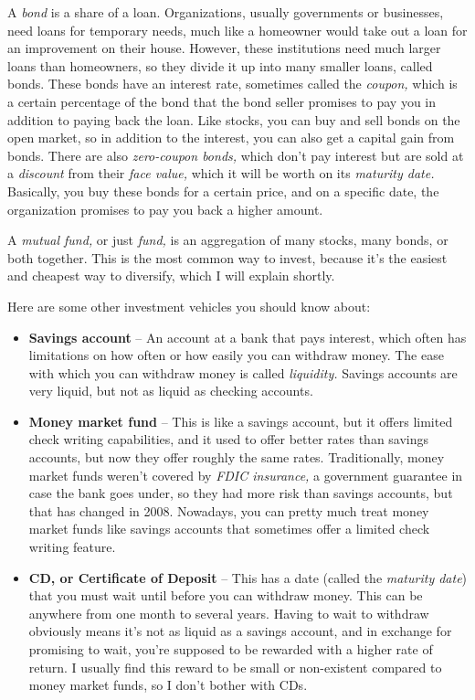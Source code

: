 A \emph{bond} is a share of a loan. Organizations, usually governments or businesses, need loans for temporary needs, much like a homeowner would take out a loan for an improvement on their house.  However, these institutions need much larger loans than homeowners, so they divide it up into many smaller loans, called bonds. These bonds have an interest rate, sometimes called the \emph{coupon,} which is a certain percentage of the bond that the bond seller promises to pay you in addition to paying back the loan. Like stocks, you can buy and sell bonds on the open market, so in addition to the interest, you can also get a capital gain from bonds. There are also \emph{zero-coupon bonds,} which don't pay interest but are sold at a \emph{discount} from their \emph{face value,} which it will be worth on its \emph{maturity date.} Basically, you buy these bonds for a certain price, and on a specific date, the organization promises to pay you back a higher amount.

A \emph{mutual fund,} or just \emph{fund,} is an aggregation of many stocks, many bonds, or both together. This is the most common way to invest, because it's the easiest and cheapest way to diversify, which I will explain shortly.

Here are some other investment vehicles you should know about:
\begin{itemize}
\item \textbf{Savings account} -- An account at a bank that pays interest, which often has limitations on how often or how easily you can withdraw money. The ease with which you can withdraw money is called \emph{liquidity.} Savings accounts are very liquid, but not as liquid as checking accounts.

\item \textbf{Money market fund} -- This is like a savings account, but it offers limited check writing capabilities, and it used to offer better rates than savings accounts, but now they offer roughly the same rates. Traditionally, money market funds weren't covered by \emph{FDIC insurance,} a government guarantee in case the bank goes under, so they had more risk than savings accounts, but that has changed in 2008. Nowadays, you can pretty much treat money market funds like savings accounts that sometimes offer a limited check writing feature.

\item \textbf{CD, or Certificate of Deposit} -- This has a date (called the \emph{maturity date}) that you must wait until before you can withdraw money. This can be anywhere from one month to several years. Having to wait to withdraw obviously means it's not as liquid as a savings account, and in exchange for promising to wait, you're supposed to be rewarded with a higher rate of return. I usually find this reward to be small or non-existent compared to money market funds, so I don't bother with CDs.
\end{itemize}

